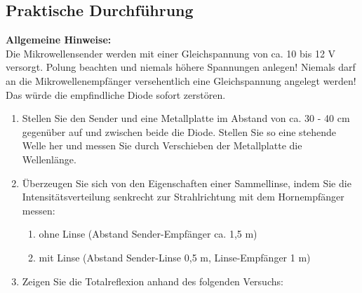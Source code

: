 \documentclass[12pt]{scrartcl}
\begin{document}
\subsection{Praktische Durchführung}
\textbf{Allgemeine Hinweise:}\\
Die Mikrowellensender werden mit einer Gleichspannung von ca. 10 bis 12 V versorgt.
Polung beachten und niemals höhere Spannungen anlegen! Niemals darf an die Mikrowellenempfänger versehentlich eine Gleichspannung angelegt werden! Das würde die empfindliche Diode sofort zerstören.
\begin{enumerate}
\item Stellen Sie den Sender und eine Metallplatte im Abstand von ca. 30 - 40 cm gegenüber auf und zwischen beide die Diode. Stellen Sie so eine stehende Welle her
und messen Sie durch Verschieben der Metallplatte die Wellenlänge.
\item
Überzeugen Sie sich von den Eigenschaften einer Sammellinse, indem Sie die Intensitätsverteilung senkrecht zur Strahlrichtung mit dem Hornempfänger messen:
\begin{enumerate}
\item ohne Linse (Abstand Sender-Empfänger ca. 1,5 m)
\item mit Linse (Abstand Sender-Linse 0,5 m, Linse-Empfänger 1 m)
\end{enumerate}
\item Zeigen Sie die Totalreflexion anhand des folgenden Versuchs:


\end{enumerate}
\end{document}
